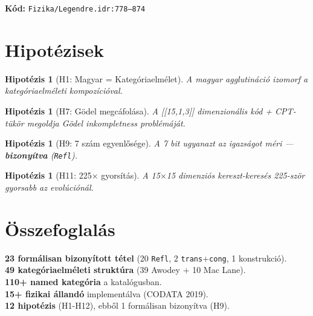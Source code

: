 \documentclass[12pt,a4paper]{article}
\newtheorem{hipotezis}[tetel]{Hipotézis}
\begin{document}
\textbf{Kód:} \texttt{Fizika/Legendre.idr:778--874}

\section{Hipotézisek}

\begin{hipotezis}[H1: Magyar = Kategóriaelmélet]
A magyar agglutináció izomorf a kategóriaelméleti kompozícióval.
\end{hipotezis}

\begin{hipotezis}[H7: Gödel megcáfolása]
A [[15,1,3]] dimenzionális kód + CPT-tükör megoldja Gödel inkompletness problémáját.
\end{hipotezis}

\begin{hipotezis}[H9: 7 szám egyenlősége]
A 7 bit ugyanazt az igazságot méri — \textbf{bizonyítva} (\texttt{Refl}).
\end{hipotezis}

\begin{hipotezis}[H11: 225$\times$ gyorsítás]
A 15$\times$15 dimenziós kereszt-keresés 225-ször gyorsabb az evolúciónál.
\end{hipotezis}

\section{Összefoglalás}

\textbf{23 formálisan bizonyított tétel} (20 \texttt{Refl}, 2 \texttt{trans}+\texttt{cong}, 1 konstrukció).\\
\textbf{49 kategóriaelméleti struktúra} (39 Awodey + 10 Mac Lane).\\
\textbf{110+ named kategória} a katalógusban.\\
\textbf{15+ fizikai állandó} implementálva (CODATA 2019).\\
\textbf{12 hipotézis} (H1-H12), ebből 1 formálisan bizonyítva (H9).
\end{document}
